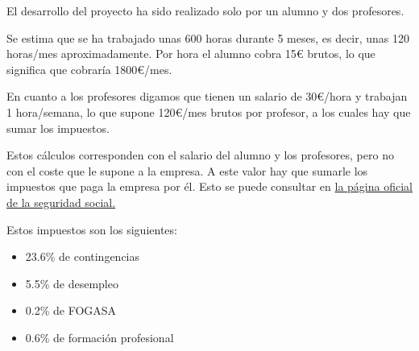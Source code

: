 El desarrollo del proyecto ha sido realizado solo por un alumno y dos profesores.

Se estima que se ha trabajado unas 600 horas durante 5 meses, es decir, unas 120 horas/mes aproximadamente. Por hora el alumno cobra 15€ brutos, lo que significa que cobraría 1800€/mes.


En cuanto a los profesores digamos que tienen un salario de 30€/hora y trabajan 1 hora/semana, lo que supone 120€/mes brutos por profesor, a los cuales hay que sumar los impuestos.


Estos cálculos corresponden con el salario del alumno y los profesores, pero no con el coste que le supone a la empresa. A este valor hay que sumarle los impuestos que paga la empresa por él. Esto se puede consultar en \href{https://www.seg-social.es/wps/portal/wss/internet/Trabajadores/CotizacionRecaudacionTrabajadores/36537}{la página oficial de la seguridad social.} \cite{wiki:cotizacionSS}

Estos impuestos son los siguientes:
\begin{itemize}
    \item 23.6\% de contingencias
    \item 5.5\% de desempleo
    \item 0.2\% de FOGASA
    \item 0.6\% de formación profesional
\end{itemize}

